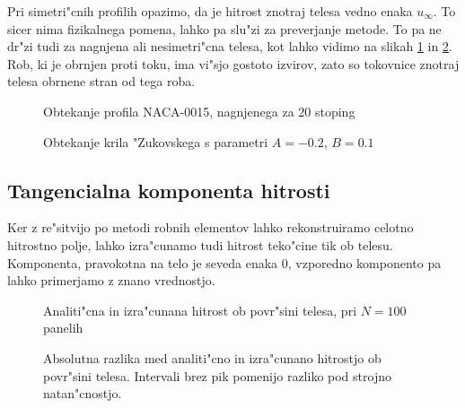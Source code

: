 \documentclass[a4paper,10pt]{article}
\begin{document}
Pri simetri"cnih profilih opazimo, da je hitrost znotraj telesa vedno enaka $u_\infty$. To sicer nima fizikalnega pomena, lahko pa slu"zi za preverjanje metode. To pa ne dr"zi tudi za nagnjena ali nesimetri"cna telesa, kot lahko vidimo na slikah \ref{fig:naca-r} in \ref{fig:zukovski}. Rob, ki je obrnjen proti toku, ima vi"sjo gostoto izvirov, zato so tokovnice znotraj telesa obrnene stran od tega roba. 

\begin{figure}[H]
 \subfigure{}
 \subfigure{}
 \caption{Obtekanje profila NACA-0015, nagnjenega za 20 stoping}
 \label{fig:naca-r}
\end{figure}

\begin{figure}[H]
 \subfigure{}
 \subfigure{}
 \caption{Obtekanje krila "Zukovskega s parametri $A=-0.2$, $B = 0.1$}
 \label{fig:zukovski}
\end{figure}

\subsection{Tangencialna komponenta hitrosti}

Ker z re"sitvijo po metodi robnih elementov lahko rekonstruiramo celotno hitrostno polje, lahko izra"cunamo tudi hitrost teko"cine tik ob telesu. Komponenta, pravokotna na telo je seveda enaka 0, vzporedno komponento pa lahko primerjamo z znano vrednostjo. 

\begin{figure}[H]

\caption{Analiti"cna in izra"cunana hitrost ob povr"sini telesa, pri $N=100$ panelih}
\label{fig:tangencialna}
\end{figure}

\begin{figure}[H]

\caption{Absolutna razlika med analiti"cno in izra"cunano hitrostjo ob povr"sini telesa. Intervali brez pik pomenijo razliko pod strojno  natan"cnostjo. }
\label{fig:tangencialna-log}
\end{figure}
\end{document}
